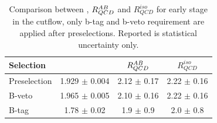 

\begin{table} [tp]
	\begin{center}
	\begin{tabular}{l  c c c }
\hline 
\hline
Selection  		&  \rqcd  			&  $R_{QCD}^{AB}$  		&  $R_{QCD}^{iso}$ \\ 
\hline
Preselection 		&   1.929 $\pm$     0.004	&	2.12 $\pm$ 0.17		&	2.22 $\pm$ 0.16	\\
B-veto			&  1.965   $\pm$   0.005    	& 2.10   $\pm$	0.16 		&	2.22 $\pm$ 0.16	\\
B-tag			&  1.78    $\pm$   0.02 	& 1.9   $\pm$	0.9 		&	2.0  $\pm$ 0.8	\\
\hline
\hline
	\end{tabular}
	  \caption{Comparison between \rqcd, $R_{QCD}^{AB}$ and $R_{QCD}^{iso}$ for early stage in the cutflow, only b-tag and b-veto
	requirement are applied after preselections. Reported is statistical uncertainty only.}
	\label{table:MCsub}
	\end{center}
\end{table}


